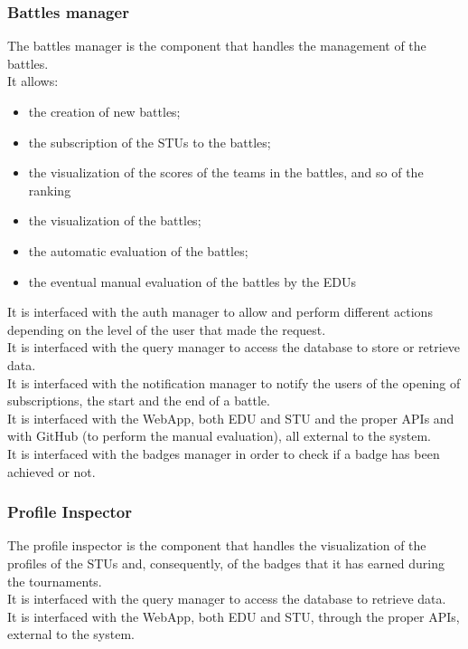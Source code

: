 \newpage

\subsubsection*{Battles manager}
The battles manager is the component that handles the management of the battles.\\
It allows:
\begin{itemize}
    \item the creation of new battles;
    \item the subscription of the STUs to the battles;
    \item the visualization of the scores of the teams in the battles, and so of the ranking
    \item the visualization of the battles;
    \item the automatic evaluation of the battles;
    \item the eventual manual evaluation of the battles by the EDUs
\end{itemize}
It is interfaced with the auth manager to allow and perform different actions depending on the level of the user that made the request. \\
It is interfaced with the query manager to access the database to store or retrieve data. \\
It is interfaced with the notification manager to notify the users of the opening of subscriptions, the start and the end of a battle.\\
It is interfaced with the WebApp, both EDU and STU and the proper APIs and with GitHub (to perform the manual evaluation), all external to the system. \\
It is interfaced with the badges manager in order to check if a badge has been achieved or not.

\subsubsection*{Profile Inspector}
The profile inspector is the component that handles the visualization of the profiles of the STUs and, consequently, of the badges that it has earned during the tournaments. \\
It is interfaced with the query manager to access the database to retrieve data. \\
It is interfaced with the WebApp, both EDU and STU, through the proper APIs, external to the system.

\newpage

